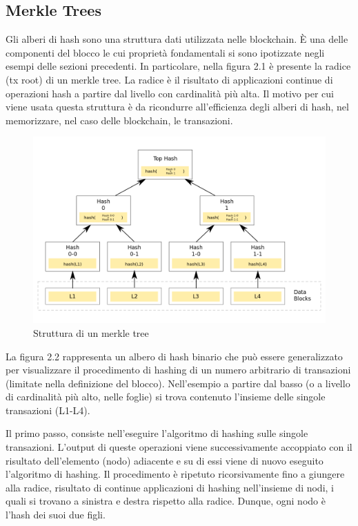 \subsection{Merkle Trees}

Gli alberi di hash sono una struttura dati utilizzata nelle blockchain. È una delle componenti del blocco le cui proprietà fondamentali si sono ipotizzate negli esempi delle sezioni precedenti. In particolare, nella figura 2.1 è presente la radice (tx root) di un merkle tree. La radice è il risultato di applicazioni continue di operazioni hash a partire dal livello con cardinalità più alta. Il motivo per cui viene usata questa struttura è da ricondurre all'efficienza degli alberi di hash, nel memorizzare, nel caso delle blockchain, le transazioni. 


\begin{figure}[H]
\centering
\includegraphics[width=1\textwidth]{immagini/hash_Trees.png}
\caption{Struttura di un merkle tree}
\label{fig:mesh}

\end{figure}

La figura 2.2 rappresenta un albero di hash binario che può essere generalizzato per visualizzare il procedimento di hashing di un numero arbitrario di transazioni (limitate nella definizione del blocco). Nell'esempio a partire dal basso (o a livello di cardinalità più alto, nelle foglie) si trova contenuto l'insieme delle singole transazioni (L1-L4).

Il primo passo, consiste nell’eseguire l'algoritmo di hashing sulle singole transazioni. L'output di queste operazioni viene successivamente accoppiato con il risultato dell'elemento (nodo) adiacente e su di essi viene di nuovo eseguito l'algoritmo di hashing. Il procedimento è ripetuto ricorsivamente fino a giungere alla radice, risultato di continue applicazioni di hashing nell'insieme di nodi, i quali si trovano a sinistra e destra rispetto alla radice. Dunque, ogni nodo è l'hash dei suoi due figli. 

